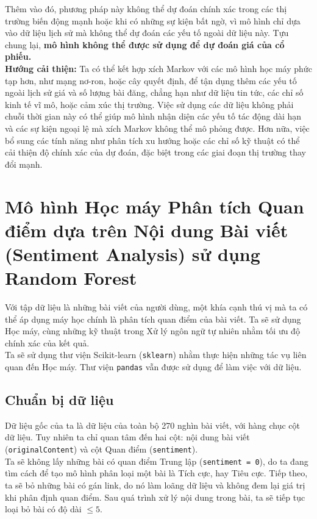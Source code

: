 Thêm vào đó, phương pháp này không thể dự đoán chính xác trong các thị trường biến động mạnh hoặc khi có những sự kiện bất ngờ, vì mô hình chỉ dựa vào dữ liệu lịch sử mà không thể dự đoán các yếu tố ngoài dữ liệu này. Tựu chung lại, \textbf{mô hình không thể được sử dụng để dự đoán giá của cổ phiếu.}\\

\textbf{Hướng cải thiện:} Ta có thể kết hợp xích Markov với các mô hình học máy phức tạp hơn, như mạng nơ-ron, hoặc cây quyết định, để tận dụng thêm các yếu tố ngoài lịch sử giá và số lượng bài đăng, chẳng hạn như dữ liệu tin tức, các chỉ số kinh tế vĩ mô, hoặc cảm xúc thị trường. Việc sử dụng các dữ liệu không phải chuỗi thời gian này có thể giúp mô hình nhận diện các yếu tố tác động dài hạn và các sự kiện ngoại lệ mà xích Markov không thể mô phỏng được. Hơn nữa, việc bổ sung các tính năng như phân tích xu hướng hoặc các chỉ số kỹ thuật có thể cải thiện độ chính xác của dự đoán, đặc biệt trong các giai đoạn thị trường thay đổi mạnh. 



\section{Mô hình Học máy Phân tích Quan điểm dựa trên Nội dung Bài viết (Sentiment Analysis) sử dụng Random Forest}
Với tập dữ liệu là những bài viết của người dùng, một khía cạnh thú vị mà ta có thể áp dụng máy học chính là phân tích quan điểm của bài viết. Ta sẽ sử dụng Học máy, cùng những kỹ thuật trong Xử lý ngôn ngữ tự nhiên nhằm tối ưu độ chính xác của kết quả.\\

Ta sẽ sử dụng thư viện Scikit-learn (\texttt{sklearn}) nhằm thực hiện những tác vụ liên quan đến Học máy. Thư viện \texttt{pandas} vẫn được sử dụng để làm việc với dữ liệu.

\subsection{Chuẩn bị dữ liệu}
Dữ liệu gốc của ta là dữ liệu của toàn bộ 270 nghìn bài viết, với hàng chục cột dữ liệu. Tuy nhiên ta chỉ quan tâm đến hai cột: nội dung bài viết (\texttt{originalContent}) và cột Quan điểm (\texttt{sentiment}).\\

Ta sẽ không lấy những bài có quan điểm Trung lập (\texttt{sentiment = 0}), do ta đang tìm cách để tạo mô hình phân loại một bài là Tích cực, hay Tiêu cực. Tiếp theo, ta sẽ bỏ những bài có gán link, do nó làm loãng dữ liệu và không đem lại giá trị khi phân định quan điểm. Sau quá trình xử lý nội dung trong bài, ta sẽ tiếp tục loại bỏ bài có độ dài $\le 5$.

